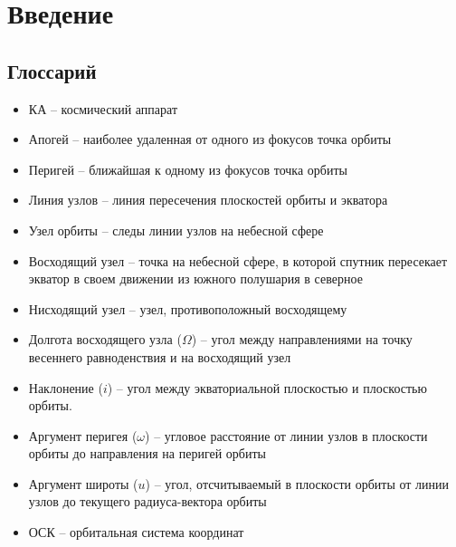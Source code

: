 \chapter{Введение}
\section{Глоссарий}
\begin{itemize}
  \item КА -- космический аппарат
  \item Апогей -- наиболее удаленная от одного из фокусов точка орбиты
  \item Перигей -- ближайшая к одному из фокусов точка орбиты
  \item Линия узлов -- линия пересечения плоскостей орбиты и экватора
  \item Узел орбиты -- следы линии узлов на небесной сфере
  \item Восходящий узел -- точка на небесной сфере, в которой спутник пересекает
  экватор в своем движении из южного полушария в северное
  \item Нисходящий узел -- узел, противоположный восходящему
  \item Долгота восходящего узла ($\Omega$) -- угол между направлениями на точку весеннего
  равноденствия и на восходящий узел
  \item Наклонение ($i$) -- угол между экваториальной плоскостью и плоскостью орбиты.
  \item Аргумент перигея ($\omega$) -- угловое расстояние от линии узлов в плоскости
  орбиты до направления на перигей орбиты
  \item Аргумент широты ($u$) -- угол, отсчитываемый в плоскости орбиты от линии
  узлов до текущего радиуса-вектора орбиты
  \item ОСК -- орбитальная система координат
\end{itemize}
